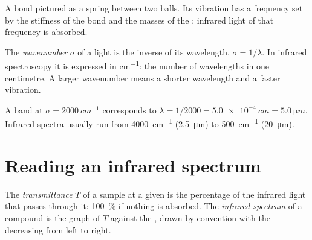 \begin{omfigure}

{\small A bond pictured as a spring between two balls. Its vibration has
a frequency set by the stiffness of the bond and the masses of the ;
infrared light of that frequency is absorbed.}
\end{omfigure}

\begin{definition}[Wavenumber]\label{def:g11:infrared:wavenumber}
The \emph{wavenumber} $\sigma$ of a light is the
inverse of its wavelength, $\sigma = 1/\lambda$. In infrared
spectroscopy it is expressed in \si{cm^{-1}}: the number of wavelengths
in one centimetre. A larger wavenumber means a shorter wavelength and a
faster vibration.
\end{definition}

\begin{example}\label{ex:g11:infrared:convert}
A band at $\sigma = \qty{2000}{cm^{-1}}$ corresponds to
$\lambda = 1/2000 = \qty{5.0e-4}{cm} = \qty{5.0}{\micro m}$. Infrared
spectra usually run from \qty{4000}{cm^{-1}} (\qty{2.5}{\micro m}) to
\qty{500}{cm^{-1}} (\qty{20}{\micro m}).
\end{example}

\section{Reading an infrared spectrum}

\begin{definition}\label{def:g11:infrared:spectrum}
The \emph{transmittance} $T$ of a sample at a given
 is the percentage of the infrared light that passes through
it: \qty{100}{\percent} if nothing is absorbed. The \emph{infrared
spectrum} of a compound is the graph of $T$
against the , drawn by convention with the 
decreasing from left to right.
\end{definition}


